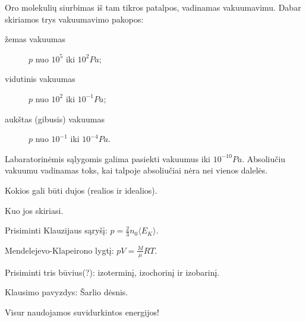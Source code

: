 Oro molekulių siurbimas iš tam tikros patalpos, vadinamas vakuumavimu.
Dabar skiriamos trys vakuumavimo pakopos:
\begin{description}
  \item[žemas vakuumas] $p$ nuo $10^{5}$ iki $10^{2} Pa$;
  \item[vidutinis vakuumas] $p$ nuo $10^{2}$ iki $10^{-1} Pa$;
  \item[aukštas (gibusis) vakuumas] $p$ nuo $10^{-1}$ iki $10^{-4} Pa$.
\end{description}
Labaratorinėmis sąlygomis galima pasiekti vakuumus iki $10^{-10}Pa$.
Absoliučiu vakuumu vadinamas toks, kai talpoje absoliučiai nėra nei
vienos dalelės.

\begin{remember}
  \item Kokios gali būti dujos (realios ir idealios).
  \item Kuo jos skiriasi.
  \item Prisiminti Klauzijaus sąryšį:
    $p = \frac{2}{3} n_{0} \langle E_{K} \rangle$.
  \item Mendelejevo-Klapeirono lygtį: $pV = \frac{M}{\mu}RT$.
  \item Prisiminti tris būvius(?): izoterminį, izochorinį ir izobarinį.
  \item Klausimo pavyzdys: Šarlio dėsnis.
  \item Visur naudojamos suvidurkintos energijos!
\end{remember}

